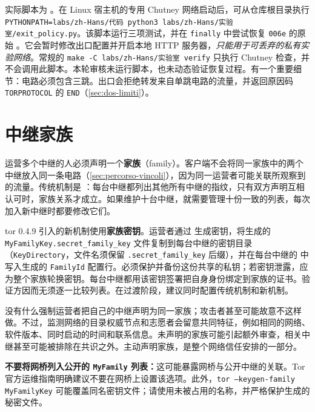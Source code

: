 实际脚本为 。在 Linux 宿主机的专用 Chutney 网络启动后，可从仓库根目录执行 \texttt{PYTHONPATH=labs/zh-Hans/代码 python3 labs/zh-Hans/实验室/exit\_policy.py}。该脚本运行三项测试，并在 \texttt{finally} 中尝试恢复 \texttt{006e} 的原始 。它会暂时修改出口配置并开启本地 HTTP 服务器，\emph{只能用于可丢弃的私有实验网络}。常规的 \texttt{make -C labs/zh-Hans/实验室 verify} 只执行 Chutney 检查，并不会调用此脚本。本轮审核未运行脚本，也未动态验证恢复过程。有一个重要细节：电路必须包含三跳。出口会拒绝转发来自单跳电路的流量，并返回原因码 \texttt{TORPROTOCOL} 的 \texttt{END}（\cref{sec:dos-limiti}）。

\section{中继家族}\label{sec:relay-famiglie}

运营多个中继的人必须声明一个\textbf{家族}（family）。客户端不会将同一家族中的两个中继放入同一条电路（\cref{sec:percorso-vincoli}），因为同一运营者可能关联所观察到的流量。传统机制是 ：每台中继都列出其他所有中继的指纹，只有双方声明互相认可时，家族关系才成立。如果维护十台中继，就需要管理十份一致的列表，每次加入新中继时都要修改它们。

tor 0.4.9 引入的新机制使用\textbf{家族密钥}。运营者通过  生成密钥，将生成的 \texttt{MyFamilyKey.secret\_family\_key} 文件复制到每台中继的密钥目录（\texttt{KeyDirectory}，文件名须保留 \texttt{.secret\_family\_key} 后缀），并在每台中继的  中写入生成的 \texttt{FamilyId} 配置行。必须保护并备份这份共享的私钥；若密钥泄露，应为整个家族轮换密钥。每台中继都用该密钥签署把自身身份绑定到家族的证书。验证方因而无须逐一比较列表。在过渡阶段，建议同时配置传统机制和新机制。

\begin{approfondimento}[为什么声明家族有帮助？]
没有什么强制运营者把自己的中继声明为同一家族；攻击者甚至可能故意不这样做。不过，监测网络的目录权威节点和志愿者会留意共同特征，例如相同的网络、软件版本、同时启动的时间和联系信息。未声明的家族可能引起额外审查，相关中继甚至可能被排除在共识之外。主动声明家族，是整个网络信任安排的一部分。
\end{approfondimento}

\textbf{不要将网桥列入公开的 \texttt{MyFamily} 列表：}这可能暴露网桥与公开中继的关联。Tor 官方运维指南明确建议不要在网桥上设置该选项。此外，\texttt{tor --keygen-family MyFamilyKey} 可能覆盖同名密钥文件；请使用未被占用的名称，并严格保护生成的秘密文件。

